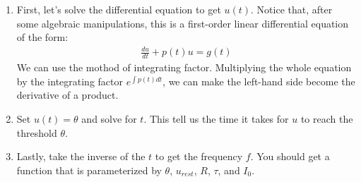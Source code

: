 \documentclass[11pt,letterpaper]{article}
\begin{document}
\begin{enumerate}
    \item First, let's solve the differential equation to get $u(t)$. Notice that, after some algebraic manipulations, this is a first-order linear differential equation of the form:
    \begin{align*}
        \frac{du}{dt} + p(t)u = g(t)
    \end{align*}
    We can use the mothod of integrating factor. Multiplying the whole equation by the integrating factor $e^{\int p(t) dt}$, we can make the left-hand side become the derivative of a product.
    \vspace{4 cm}
    
    \item Set $u(t) = \theta$ and solve for $t$. This tell us the time it takes for $u$ to reach the threshold $\theta$.
    \vspace{4 cm}

    \item Lastly, take the inverse of the $t$ to get the frequency $f$. You should get a function that is parameterized by $\theta$, $u_{rest}$, $R$, $\tau$, and $I_0$.
\end{enumerate}
\pagebreak
\end{document}

